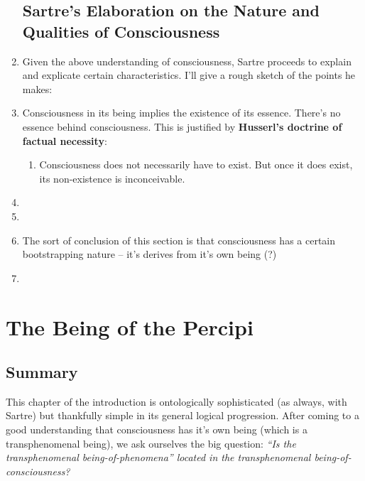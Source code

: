 \begin{enumerate}
  \subsection{Sartre's Elaboration on the Nature and Qualities of Consciousness}
  \item Given the above understanding of consciousness, Sartre proceeds to explain and explicate certain characteristics. I'll give a rough sketch of the points he makes:
  \item Consciousness in its being implies the existence of its essence. There's no essence behind consciousness. This is justified by \textbf{Husserl's doctrine of factual necessity}:
  \begin{enumerate}
    \item Consciousness does not necessarily have to exist. But once it does exist, its non-existence is inconceivable.
  \end{enumerate}
  \item {}
  \item {}
  \item The sort of conclusion of this section is that consciousness has a certain bootstrapping nature -- it's derives from it's own being (?)
  \item {}
\end{enumerate}

\section{The Being of the Percipi}
\subsection*{Summary}
This chapter of the introduction is ontologically sophisticated (as always, with Sartre) but thankfully simple in its general logical progression. After coming to a good understanding that consciousness has it's own being (which is a transphenomenal being), we ask ourselves the big question: \emph{\enquote{Is the transphenomenal being-of-phenomena} located in the transphenomenal being-of-consciousness?}

